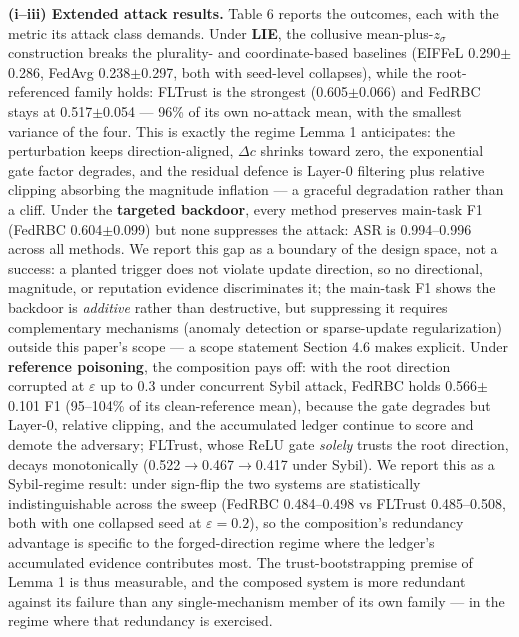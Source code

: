 \documentclass[cmc,article,submit,moreauthors,pdftex]{Definitions/tsp}
\begin{document}
\textbf{(i--iii) Extended attack results.} Table 6 reports the outcomes, each with the metric its attack class demands. Under \textbf{LIE}, the collusive mean-plus-$z_\sigma$ construction breaks the plurality- and coordinate-based baselines (EIFFeL 0.290$\pm$0.286, FedAvg 0.238$\pm$0.297, both with seed-level collapses), while the root-referenced family holds: FLTrust is the strongest (0.605$\pm$0.066) and FedRBC stays at 0.517$\pm$0.054 --- 96\% of its own no-attack mean, with the smallest variance of the four. This is exactly the regime Lemma 1 anticipates: the perturbation keeps direction-aligned, $\Delta c$ shrinks toward zero, the exponential gate factor degrades, and the residual defence is Layer-0 filtering plus relative clipping absorbing the magnitude inflation --- a graceful degradation rather than a cliff. Under the \textbf{targeted backdoor}, every method preserves main-task F1 (FedRBC 0.604$\pm$0.099) but none suppresses the attack: ASR is 0.994--0.996 across all methods. We report this gap as a boundary of the design space, not a success: a planted trigger does not violate update direction, so no directional, magnitude, or reputation evidence discriminates it; the main-task F1 shows the backdoor is \emph{additive} rather than destructive, but suppressing it requires complementary mechanisms (anomaly detection or sparse-update regularization) outside this paper's scope --- a scope statement Section 4.6 makes explicit. Under \textbf{reference poisoning}, the composition pays off: with the root direction corrupted at $\varepsilon$ up to 0.3 under concurrent Sybil attack, FedRBC holds 0.566$\pm$0.101 F1 (95--104\% of its clean-reference mean), because the gate degrades but Layer-0, relative clipping, and the accumulated ledger continue to score and demote the adversary; FLTrust, whose ReLU gate \emph{solely} trusts the root direction, decays monotonically (0.522$\to$0.467$\to$0.417 under Sybil). We report this as a Sybil-regime result: under sign-flip the two systems are statistically indistinguishable across the sweep (FedRBC 0.484--0.498 vs FLTrust 0.485--0.508, both with one collapsed seed at $\varepsilon{=}0.2$), so the composition's redundancy advantage is specific to the forged-direction regime where the ledger's accumulated evidence contributes most. The trust-bootstrapping premise of Lemma 1 is thus measurable, and the composed system is more redundant against its failure than any single-mechanism member of its own family --- in the regime where that redundancy is exercised.
\end{document}
